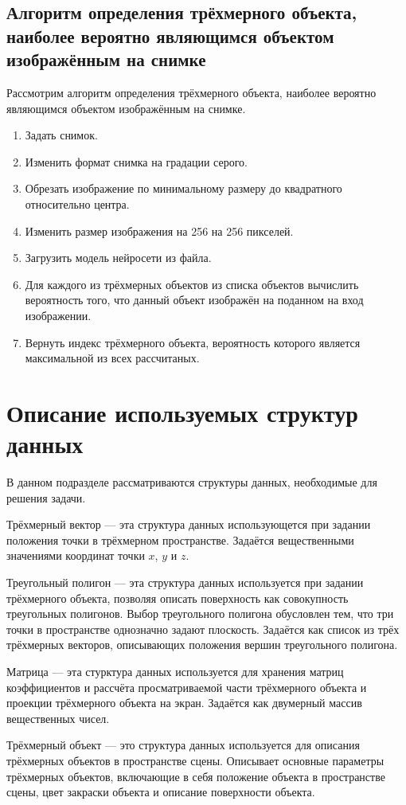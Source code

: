 \subsection{Алгоритм определения трёхмерного объекта, наиболее вероятно являющимся объектом изображённым на снимке}
Рассмотрим алгоритм определения трёхмерного объекта, наиболее вероятно являющимся объектом изображённым на снимке.
\begin{enumerate}
\item Задать снимок.
\item Изменить формат снимка на градации серого.
\item Обрезать изображение по минимальному размеру до квадратного относительно центра.
\item Изменить размер изображения на 256 на 256 пикселей.
\item Загрузить модель нейросети из файла.
\item Для каждого из трёхмерных объектов из списка объектов вычислить вероятность того, что данный объект изображён на поданном на вход изображении.
\item Вернуть индекс трёхмерного объекта, вероятность которого является максимальной из всех рассчитаных.
\end{enumerate}

\section{Описание используемых структур данных}
В данном подразделе рассматриваются структуры данных, необходимые для решения задачи.

Трёхмерный вектор --- эта структура данных использующется при задании положения точки в трёхмерном пространстве. Задаётся вещественными значениями координат точки $x$, $y$ и $z$.

Треугольный полигон --- эта структура данных используется при задании трёхмерного объекта, позволяя описать поверхность как совокупность треугольных полигонов. Выбор треугольного полигона обусловлен тем, что три точки в пространстве однозначно задают плоскость. Задаётся как список из трёх трёхмерных векторов, описывающих положения вершин треугольного полигона.

Матрица --- эта стурктура данных используется для хранения матриц коэффициентов и рассчёта просматриваемой части трёхмерного объекта и проекции трёхмерного объекта на экран. Задаётся как двумерный массив вещественных чисел.

Трёхмерный объект --- это структура данных используется для описания трёхмерных объектов в пространстве сцены. Описывает основные параметры трёхмерных объектов, включающие в себя положение объекта в пространстве сцены, цвет закраски объекта и описание поверхности объекта.


